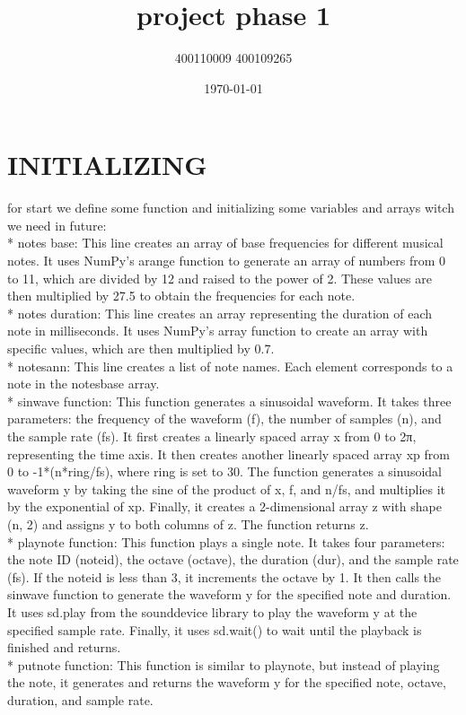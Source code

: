 \documentclass[12pt]{article}
\title{project phase 1}
\subtitle{400110009  400109265}
\date{\today}
\begin{document}
\maketitlepage
\maketitlestart

\section{INITIALIZING}
for start we define some function and initializing some variables and arrays witch we need in future:
\\
* notes base: This line creates an array of base frequencies for different musical notes. It uses NumPy's arange function to generate an array of numbers from 0 to 11, which are divided by 12 and raised to the power of 2. These values are then multiplied by 27.5 to obtain the frequencies for each note.
\\
* notes duration: This line creates an array representing the duration of each note in milliseconds. It uses NumPy's array function to create an array with specific values, which are then multiplied by 0.7.
\\
* notesann: This line creates a list of note names. Each element corresponds to a note in the notesbase array.
\\
* sinwave function: This function generates a sinusoidal waveform. It takes three parameters: the frequency of the waveform (f), the number of samples (n), and the sample rate (fs). It first creates a linearly spaced array x from 0 to 2π, representing the time axis. It then creates another linearly spaced array xp from 0 to -1*(n*ring/fs), where ring is set to 30. The function generates a sinusoidal waveform y by taking the sine of the product of x, f, and n/fs, and multiplies it by the exponential of xp. Finally, it creates a 2-dimensional array z with shape (n, 2) and assigns y to both columns of z. The function returns z.
\\
* playnote function: This function plays a single note. It takes four parameters: the note ID (noteid), the octave (octave), the duration (dur), and the sample rate (fs). If the noteid is less than 3, it increments the octave by 1. It then calls the sinwave function to generate the waveform y for the specified note and duration. It uses sd.play from the sounddevice library to play the waveform y at the specified sample rate. Finally, it uses sd.wait() to wait until the playback is finished and returns.
\\
* putnote function: This function is similar to playnote, but instead of playing the note, it generates and returns the waveform y for the specified note, octave, duration, and sample rate.
\\
\end{document}
